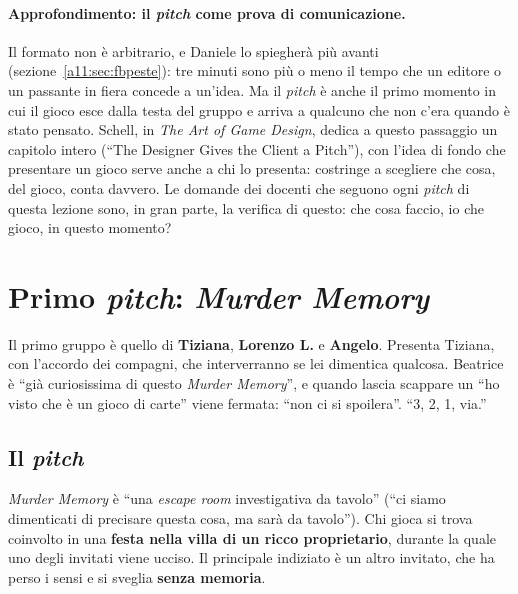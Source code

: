 \paragraph{Approfondimento: il \emph{pitch} come prova di comunicazione.} Il formato
non è arbitrario, e Daniele lo spiegherà più avanti (sezione~\ref{a11:sec:fbpeste}):
tre minuti sono più o meno il tempo che un editore o un passante in fiera concede a
un'idea. Ma il \emph{pitch} è anche il primo momento in cui il gioco esce dalla testa del
gruppo e arriva a qualcuno che non c'era quando è stato pensato. Schell, in \emph{The Art
of Game Design}, dedica a questo passaggio un capitolo intero (``The Designer Gives the
Client a Pitch''), con l'idea di fondo che presentare un gioco serve anche a chi lo
presenta: costringe a scegliere che cosa, del gioco, conta davvero. Le domande dei docenti che seguono ogni \emph{pitch} di questa lezione
sono, in gran parte, la verifica di questo: che cosa faccio, io che gioco, in questo
momento?

\section{Primo \emph{pitch}: \emph{Murder Memory}}
\label{a11:sec:murder}

Il primo gruppo è quello di \textbf{Tiziana}, \textbf{Lorenzo L.} e \textbf{Angelo}.
Presenta Tiziana, con l'accordo dei compagni, che interverranno se lei dimentica
qualcosa. Beatrice è ``già curiosissima di questo \emph{Murder Memory}'', e quando
lascia scappare un ``ho visto che è un gioco di carte'' viene fermata: ``non ci si
spoilera''. ``3, 2, 1, via.''

\subsection{Il \emph{pitch}}

\emph{Murder Memory} è ``una \emph{escape room} investigativa da tavolo'' (``ci siamo
dimenticati di precisare questa cosa, ma sarà da tavolo''). Chi gioca si trova coinvolto
in una \textbf{festa nella villa di un ricco proprietario}, durante la quale uno degli
invitati viene ucciso. Il principale indiziato è un altro invitato, che ha perso i sensi
e si sveglia \textbf{senza memoria}.


